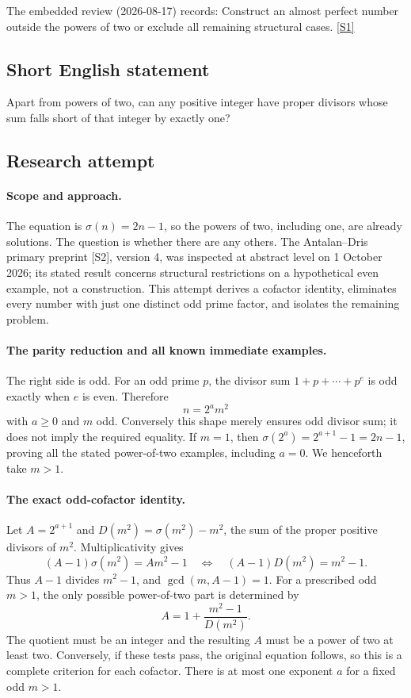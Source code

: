 \documentclass[11pt,a4paper]{article}
\newcommand{\sref}[2]{\hyperlink{source:#1:#2}{[S#2]}}
\begin{document}
The embedded review (2026-08-17) records: Construct an almost perfect number outside the powers of two or exclude all remaining structural cases. \sref{1251}{1}

\subsection{Short English statement}

Apart from powers of two, can any positive integer have proper divisors whose sum falls short of that integer by exactly one?

\subsection{Research attempt}

\paragraph{Scope and approach.}
The equation is $\sigma(n)=2n-1$, so the powers of two, including one,
are already solutions. The question is whether there are any others.
The Antalan--Dris primary preprint [S2], version 4, was inspected at
abstract level on 1 October 2026; its stated result concerns structural
restrictions on a hypothetical even example, not a construction.
This attempt derives a cofactor identity, eliminates every number with
just one distinct odd prime factor, and isolates the remaining problem.

\paragraph{The parity reduction and all known immediate examples.}
The right side is odd. For an odd prime $p$, the divisor sum
$1+p+\cdots+p^e$ is odd exactly when $e$ is even. Therefore
\[
                          n=2^a m^2
\]
with $a\ge0$ and $m$ odd. Conversely this shape merely ensures odd
divisor sum; it does not imply the required equality. If $m=1$, then
$\sigma(2^a)=2^{a+1}-1=2n-1$, proving all the stated power-of-two
examples, including $a=0$. We henceforth take $m>1$.

\paragraph{The exact odd-cofactor identity.}
Let $A=2^{a+1}$ and $D(m^2)=\sigma(m^2)-m^2$, the sum of the
proper positive divisors of $m^2$. Multiplicativity gives
\[
 (A-1)\sigma(m^2)=Am^2-1
 \quad\Longleftrightarrow\quad
                       (A-1)D(m^2)=m^2-1.
\]
Thus $A-1$ divides $m^2-1$, and $\gcd(m,A-1)=1$.
For a prescribed odd $m>1$, the only possible power-of-two part is
determined by
\[
             A=1+\frac{m^2-1}{D(m^2)}.
\]
The quotient must be an integer and the resulting $A$ must be a power
of two at least two. Conversely, if these tests pass, the original
equation follows, so this is a complete criterion for each cofactor.
There is at most one exponent $a$ for a fixed odd $m>1$.
\end{document}
